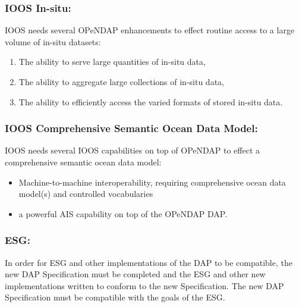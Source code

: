 
\subsubsection{\ac{IOOS} In-situ:}

\ac{IOOS} needs several \ac{OPeNDAP} enhancements to effect routine
access to a large volume of in-situ datasets: 

\begin{enumerate}
   \item The ability to serve large quantities of in-situ data,
   \item The ability to aggregate large collections of in-situ data,
   \item The ability to efficiently access the varied formats of stored
         in-situ data.
\end{enumerate}

\subsubsection{\ac{IOOS} Comprehensive Semantic Ocean Data Model:}

\ac{IOOS} needs several \ac{IOOS} capabilities on top of \ac{OPeNDAP} to effect
a comprehensive semantic ocean data model:

\begin{itemize}
   \item Machine-to-machine interoperability, requiring comprehensive
         ocean data model(s) and controlled vocabularies
   \item a powerful \ac{AIS} capability on top of the \ac{OPeNDAP} \ac{DAP}.
\end{itemize}

\subsubsection{\ac{ESG}:}

In order for \ac{ESG} and other implementations of the \ac{DAP} to be
compatible, the new \ac{DAP} Specification must be completed
and the \ac{ESG} and other new implementations written to conform
to the new Specification.  The new \ac{DAP} Specification must
be compatible with the goals of the \ac{ESG}.  

%
%
%
%

